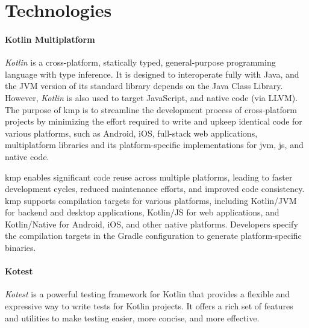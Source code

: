
\section{Technologies}
\label{sec:technologies}

\paragraph{Kotlin Multiplatform}
\label{par:kotlin-multiplatform}

\emph{Kotlin} is a cross-platform, statically typed, general-purpose programming language with type inference.
It is designed to interoperate fully with Java, and the JVM version of its standard library depends on the Java Class Library.
However, \emph{Kotlin} is also used to target JavaScript, and native code (via LLVM).
The purpose of \ac{kmp} is to streamline the development process of cross-platform projects by minimizing
the effort required to write and upkeep identical code for various platforms, such as Android, iOS, full-stack web applications,
multiplatform libraries and its platform-specific implementations for \ac{jvm}, \ac{js}, and native code.

\ac{kmp} enables significant code reuse across multiple platforms, leading to faster development cycles,
reduced maintenance efforts, and improved code consistency.
\ac{kmp} supports compilation targets for various platforms, including Kotlin/JVM for backend and desktop applications,
Kotlin/JS for web applications, and Kotlin/Native for Android, iOS, and other native platforms.
Developers specify the compilation targets in the Gradle configuration to generate platform-specific binaries.

\paragraph{Kotest}
\emph{Kotest} is a powerful testing framework for Kotlin that provides a flexible and expressive way to write tests for Kotlin projects.
It offers a rich set of features and utilities to make testing easier, more concise, and more effective.

